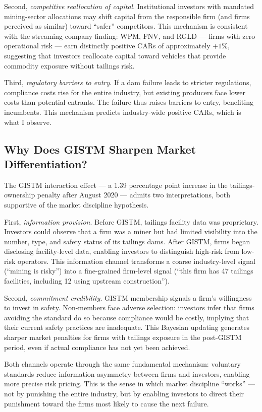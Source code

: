 \documentclass[12pt]{article}
\begin{document}
Second, \emph{competitive reallocation of capital}. Institutional investors with mandated mining-sector allocations may shift capital from the responsible firm (and firms perceived as similar) toward ``safer'' competitors. This mechanism is consistent with the streaming-company finding: WPM, FNV, and RGLD --- firms with zero operational risk --- earn distinctly positive CARs of approximately $+1\%$, suggesting that investors reallocate capital toward vehicles that provide commodity exposure without tailings risk.

Third, \emph{regulatory barriers to entry}. If a dam failure leads to stricter regulations, compliance costs rise for the entire industry, but existing producers face lower costs than potential entrants. The failure thus raises barriers to entry, benefiting incumbents. This mechanism predicts industry-wide positive CARs, which is what I observe.

\subsection{Why Does GISTM Sharpen Market Differentiation?}

The GISTM interaction effect --- a 1.39 percentage point increase in the tailings-ownership penalty after August 2020 --- admits two interpretations, both supportive of the market discipline hypothesis.

First, \emph{information provision}. Before GISTM, tailings facility data was proprietary. Investors could observe that a firm was a miner but had limited visibility into the number, type, and safety status of its tailings dams. After GISTM, firms began disclosing facility-level data, enabling investors to distinguish high-risk from low-risk operators. This information channel transforms a coarse industry-level signal (``mining is risky'') into a fine-grained firm-level signal (``this firm has 47 tailings facilities, including 12 using upstream construction'').

Second, \emph{commitment credibility}. GISTM membership signals a firm's willingness to invest in safety. Non-members face adverse selection: investors infer that firms avoiding the standard do so because compliance would be costly, implying that their current safety practices are inadequate. This Bayesian updating generates sharper market penalties for firms with tailings exposure in the post-GISTM period, even if actual compliance has not yet been achieved.

Both channels operate through the same fundamental mechanism: voluntary standards reduce information asymmetry between firms and investors, enabling more precise risk pricing. This is the sense in which market discipline ``works'' --- not by punishing the entire industry, but by enabling investors to direct their punishment toward the firms most likely to cause the next failure.
\end{document}
